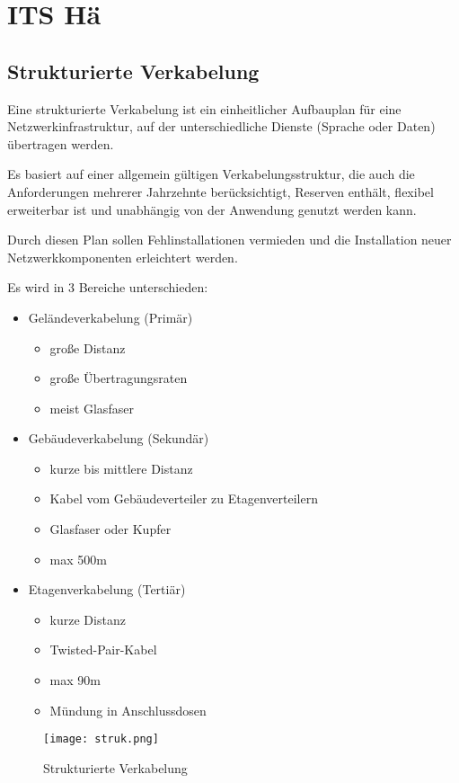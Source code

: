 \documentclass[asp1.tex]{subfiles}
\begin{document}
\section{ITS Hä}

\subsection{Strukturierte Verkabelung}

Eine strukturierte Verkabelung ist ein einheitlicher Aufbauplan für eine Netzwerkinfrastruktur, auf der unterschiedliche Dienste (Sprache oder Daten) übertragen werden.

Es basiert auf einer allgemein gültigen Verkabelungsstruktur, die auch die Anforderungen mehrerer Jahrzehnte berücksichtigt, Reserven enthält, flexibel erweiterbar ist und unabhängig von der Anwendung genutzt werden kann.

Durch diesen Plan sollen Fehlinstallationen vermieden und die Installation neuer Netzwerkkomponenten erleichtert werden.

\break

Es wird in 3 Bereiche unterschieden:
\begin{itemize}
    \item Geländeverkabelung (Prim\"ar)
        \begin{itemize}
            \item große Distanz
            \item große \"Ubertragungsraten
            \item meist Glasfaser
        \end{itemize}
    \item Gebäudeverkabelung (Sekund\"ar)
        \begin{itemize}
            \item kurze bis mittlere Distanz
            \item Kabel vom Geb\"audeverteiler zu Etagenverteilern
            \item Glasfaser oder Kupfer
            \item max 500m
        \end{itemize}
    \item Etagenverkabelung (Terti\"ar)
        \begin{itemize}
            \item kurze Distanz
            \item Twisted-Pair-Kabel
            \item max 90m
            \item M\"undung in Anschlussdosen
        \end{itemize}
\end{itemize}
\begin{figure}[H]
\begin{center}
  \texttt{[image: struk.png]}
  \end{center}
  \caption{Strukturierte Verkabelung}
  \label{fig:Strukturierte Verkabelung}
\end{figure}
\break
\end{document}
